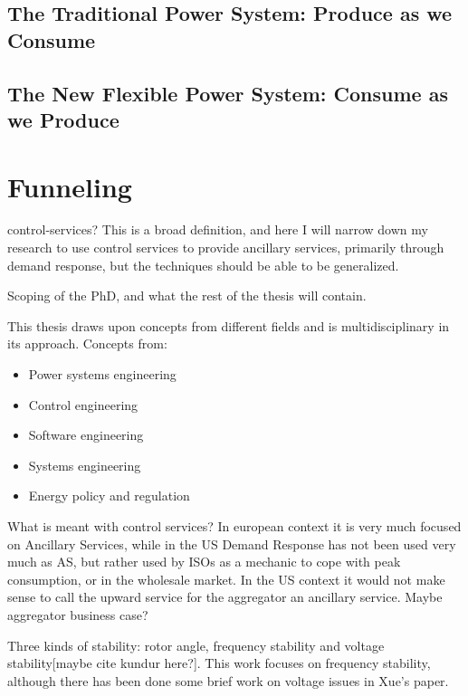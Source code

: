 \subsection*{The Traditional Power System: Produce as we Consume}
\label{sub:traditional}

\subsection*{The New Flexible Power System: Consume as we Produce}
\label{sub:future}


\section{Funneling} %
\label{sec:Funneling}
 control-services? This is a broad definition, and here I will  narrow down my research to use control services to provide ancillary services, primarily through demand response, but the techniques should be able to be generalized.

Scoping of the PhD, and what the rest of the thesis will contain.

This thesis draws upon concepts from different fields and is multidisciplinary in its approach. Concepts from:
\begin{itemize}
	\item Power systems engineering
	\item Control engineering
	\item Software engineering
	\item Systems engineering
	\item Energy policy and regulation
\end{itemize}

What is meant with control services? In european context it is very much focused on Ancillary Services, while in the US Demand Response has not been used very much as AS, but rather used by ISOs as a mechanic to cope with peak consumption, or in the wholesale market. In the US context it would not make sense to call the upward service for the aggregator an ancillary service. Maybe aggregator business case?

Three kinds of stability: rotor angle, frequency stability and voltage stability[maybe cite kundur here?]. This work focuses on frequency stability, although there has been done some brief work on voltage issues in Xue's paper. 

